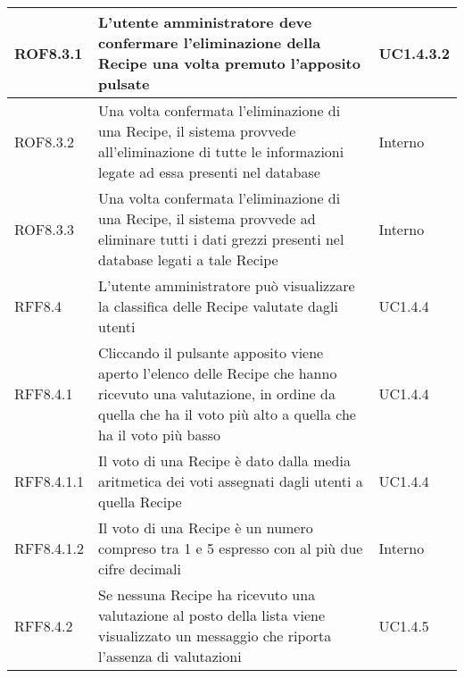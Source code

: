 \begin{center}
\begin{longtable}{| p{2.5cm} | p{8cm} | p{2cm} |}
		\hline
		ROF8.3.1  &  L'utente amministratore deve confermare l'eliminazione della Recipe una volta premuto l'apposito pulsate  &  UC1.4.3.2 \\
		\hline
		ROF8.3.2  &  Una volta confermata l'eliminazione di una Recipe, il sistema provvede all'eliminazione di tutte le informazioni legate ad essa presenti nel database  &  Interno \\
		\hline
		ROF8.3.3  &  Una volta confermata l'eliminazione di una Recipe, il sistema provvede ad eliminare tutti i dati grezzi presenti nel database legati a tale Recipe  &  Interno \\
		\hline
		RFF8.4 & L'utente amministratore può visualizzare la classifica delle Recipe valutate dagli utenti  & UC1.4.4  \\
		\hline
		RFF8.4.1 & Cliccando il pulsante apposito viene aperto l'elenco delle Recipe che hanno ricevuto una valutazione, in ordine da quella che ha il voto più alto a quella che ha il voto più basso  & UC1.4.4  \\
		\hline
		RFF8.4.1.1 & Il voto di una Recipe è dato dalla media aritmetica dei voti assegnati dagli utenti a quella Recipe  & UC1.4.4  \\
		\hline
		RFF8.4.1.2 & Il voto di una Recipe è un numero compreso tra 1 e 5 espresso con al più due cifre decimali  &  Interno  \\
		\hline
		RFF8.4.2 & Se nessuna Recipe ha ricevuto una valutazione al posto della lista viene visualizzato un messaggio che riporta l'assenza di valutazioni  & UC1.4.5  \\
		\hline




\end{longtable}
\end{center}
